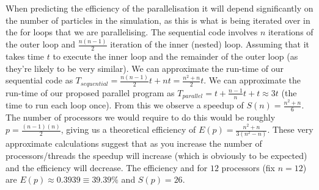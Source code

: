 \documentclass[12pt, a4paper]{article}
\begin{document}
 \par When predicting the efficiency of the parallelisation it will depend significantly on the number of particles in the simulation, as this is what is being iterated over in the for loops that we are parallelising. The sequential code involves $n$ iterations of the outer loop and $\frac{n(n-1)}{2}$ iteration of the inner (nested) loop. Assuming that it takes time $t$ to execute the inner loop and the remainder of the outer loop (as they're likely to be very similar). We can approximate the run-time of our sequential code as $T_{sequential} = \frac{n(n-1)}{2}t + nt = \frac{n^2 +n}{2}t$. We can approximate the run-time of our proposed parallel program as $T_{parallel} = t + \frac{n-1}{n}t + t \approx 3t$ (the time to run each loop once). From this we observe a speedup of $S(n) = \frac{n^2+n}{6}$. The number of processors we would require to do this would be roughly $p = \frac{(n-1)(n)}{2}$, giving us a theoretical efficiency of $E(p) = \frac{n^2+n}{3(n^2-n)}$. These very approximate calculations suggest that as you increase the number of processors/threads the speedup will increase (which is obviously to be expected) and the efficiency will decrease. The efficiency and for $12$ processors (fix $n=12$) are $E(p) \approx 0.3939 \equiv 39.39\%$ and $S(p) =26$.
 
\end{document}
